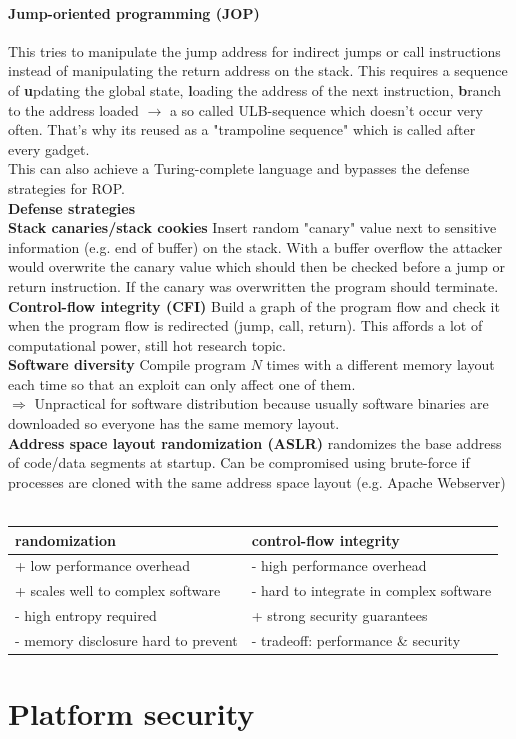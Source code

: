 \documentclass[12pt]{article}
\begin{document}
	\paragraph{Jump-oriented programming (JOP)} This tries to manipulate the jump address for indirect jumps or call instructions instead of manipulating the return address on the stack. This requires a sequence of \textbf{u}pdating the global state, \textbf{l}oading the address of the next instruction, \textbf{b}ranch to the address loaded $\rightarrow$ a so called ULB-sequence which doesn't occur very often. That's why its reused as a "trampoline sequence" which is called after every gadget.\\
	This can also achieve a Turing-complete language and bypasses the defense strategies for ROP.\\
	\textbf{Defense strategies}\\
	\textbf{Stack canaries/stack cookies} Insert random "canary" value next to sensitive information (e.g. end of buffer) on the stack. With a buffer overflow the attacker would overwrite the canary value which should then be checked before a jump or return instruction. If the canary was overwritten the program should terminate.\\
	\textbf{Control-flow integrity (CFI)} Build a graph of the program flow and check it when the program flow is redirected (jump, call, return). This affords a lot of computational power, still hot research topic.\\
	\textbf{Software diversity} Compile program $N$ times with a different memory layout each time so that an exploit can only affect one of them.\\
	$\Rightarrow$ Unpractical for software distribution because usually software binaries are downloaded so everyone has the same memory layout.\\
	\textbf{Address space layout randomization (ASLR)} randomizes the base address of code/data segments at startup. Can be compromised using brute-force if processes are cloned with the same address space layout (e.g. Apache Webserver)\\
	\\
	\begin{tabular}{|l|l|}
		\hline 
		\textbf{randomization} & \textbf{control-flow integrity} \\ 
		\hline 
		+ low performance overhead & - high performance overhead \\ 
		+ scales well to complex software & - hard to integrate in complex software \\ 
		- high entropy required & + strong security guarantees \\ 
		- memory disclosure hard to prevent & - tradeoff: performance \& security \\ 
		\hline 
	\end{tabular}

	\section{Platform security}
	
	
\end{document}
